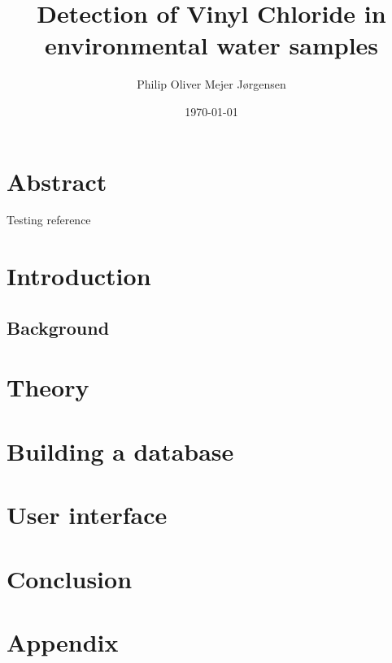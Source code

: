\documentclass{article}
\title{Detection of Vinyl Chloride in environmental water samples}
\author{Philip Oliver Mejer Jørgensen}
\date{\today}
\begin{document}
\maketitle

\newpage

\tableofcontents

\newpage

\section{Abstract}
Testing reference \cite{gc_shimadzu}

\section{Introduction}
\subsection{Background}

\section{Theory}


\section{Building a database}


\section{User interface}


\section{Conclusion}

\printbibliography

\section{Appendix}
\end{document}
